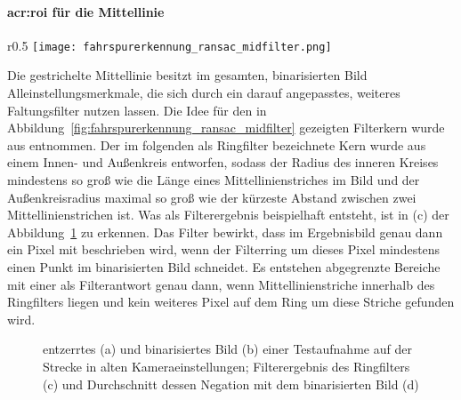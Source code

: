 \paragraph{\gls{acr:roi} für die Mittellinie}

\begin{wrapfigure}{r}{0.5\textwidth}
	\centering
	\texttt{[image: fahrspurerkennung\_ransac\_midfilter.png]}
	\caption{Der Kern des \\ \glqq Ringfilters\grqq}
	\label{fig:fahrspurerkennung_ransac_midfilter}
\end{wrapfigure} 

Die gestrichelte Mittellinie besitzt im gesamten, binarisierten Bild Alleinstellungsmerkmale, die sich durch ein darauf angepasstes, weiteres Faltungsfilter nutzen lassen. Die Idee für den in Abbildung~\ref{fig:fahrspurerkennung_ransac_midfilter} gezeigten Filterkern wurde aus \autocite{drauschkeEchtzeitfaehigeStartpunktalgorithmenFuer2016} entnommen. Der im folgenden als \glqq Ringfilter\grqq{} bezeichnete Kern wurde aus einem Innen- und Außenkreis entworfen, sodass der Radius des inneren Kreises mindestens so groß wie die Länge eines Mittellinienstriches im Bild und der Außenkreisradius maximal so groß wie der kürzeste Abstand zwischen zwei Mittellinienstrichen ist. Was als Filterergebnis beispielhaft entsteht, ist in (c) der Abbildung~\ref{fig:fahrspurerkennung_ransac_binarisieren} zu erkennen. Das Filter bewirkt, dass im Ergebnisbild genau dann ein Pixel mit \grqq{} beschrieben wird, wenn der Filterring um dieses Pixel mindestens einen Punkt im binarisierten Bild schneidet. Es entstehen abgegrenzte Bereiche mit einer \grqq{} als Filterantwort genau dann, wenn Mittellinienstriche innerhalb des \glqq Ringfilters\grqq{} liegen und kein weiteres Pixel auf dem Ring um diese Striche gefunden wird. 

\begin{figure}[htbp]
	\centering
	\hfill
	\hfill
	\hfill
	\caption{entzerrtes (a) und binarisiertes Bild (b) einer Testaufnahme auf der Strecke in alten Kameraeinstellungen; Filterergebnis des \glqq Ringfilters\grqq{} (c) und Durchschnitt dessen Negation mit dem binarisierten Bild (d)}
	\label{fig:fahrspurerkennung_ransac_binarisieren}
\end{figure} 

